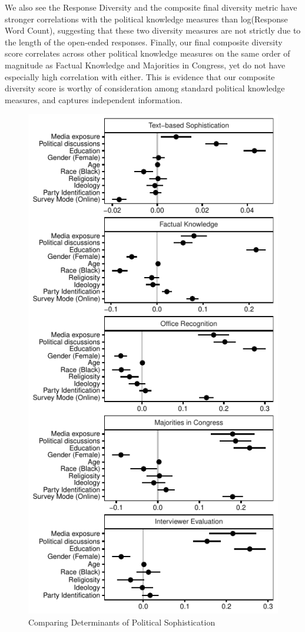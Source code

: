 \documentclass[12pt]{article}
\begin{document}
We also see the Response Diversity and the composite final diversity metric have stronger correlations with the political knowledge measures than log(Response Word Count), suggesting that these two diversity measures are not strictly due to the length of the open-ended responses.  Finally, our final composite diversity score correlates across other political knowledge measures on the same order of magnitude as Factual Knowledge and Majorities in Congress, yet do not have especially high correlation with either.  This is evidence that our composite diversity score is worthy of consideration among standard political knowledge measures, and captures independent information.    

\begin{figure}[h]
\includegraphics[width=\textwidth]{../fig/models.pdf}
\caption{Comparing Determinants of Political Sophistication}\label{fig:models}
\end{figure}
\end{document}
